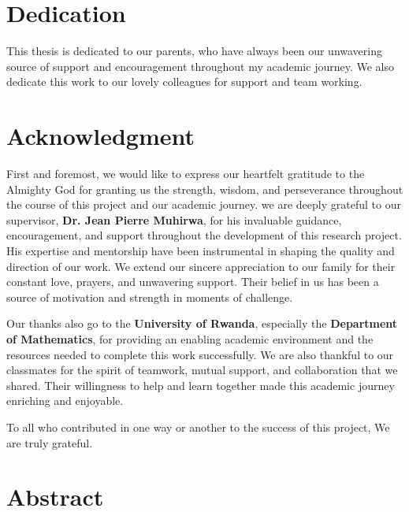\documentclass[a4paper,12pt]{report}
\begin{document}
\newpage




    \chapter*{ Dedication}

 This thesis is dedicated to our parents, who have always been our unwavering source of support and encouragement throughout my academic journey. We also dedicate this work to our lovely colleagues for support and team working.

\newpage


    

\chapter*{ Acknowledgment}


First and foremost, we would like to express our heartfelt gratitude to the Almighty God for granting us the strength, wisdom, and perseverance throughout the course of this project and our academic journey. we are deeply grateful to our supervisor, \textbf{Dr. Jean Pierre Muhirwa}, for his invaluable guidance, encouragement, and support throughout the development of this research project. His expertise and mentorship have been instrumental in shaping the quality and direction of our work. We extend our sincere appreciation to our family for their constant love, prayers, and unwavering support. Their belief in us has been a source of motivation and strength in moments of challenge.

Our thanks also go to the \textbf{University of Rwanda}, especially the \textbf{Department of Mathematics}, for providing an enabling academic environment and the resources needed to complete this work successfully. We are also thankful to our classmates for the spirit of teamwork, mutual support, and collaboration that we shared. Their willingness to help and learn together made this academic journey enriching and enjoyable.

To all who contributed in one way or another to the success of this project, We are  truly grateful.







\chapter*{Abstract}
\end{document}
